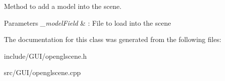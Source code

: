 Method to add a model into the scene. 


\begin{DoxyParams}{Parameters}
{\em \+\_\+model\+Field} & \+: File to load into the scene \\
\hline
\end{DoxyParams}


The documentation for this class was generated from the following files\+:\begin{DoxyCompactItemize}
\item 
include/\+G\+U\+I/openglscene.\+h\item 
src/\+G\+U\+I/openglscene.\+cpp\end{DoxyCompactItemize}
